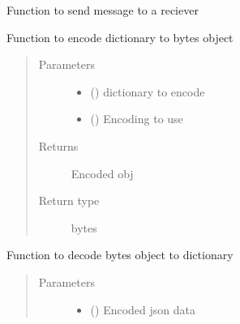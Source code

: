 \documentclass[letterpaper,10pt,english]{sphinxmanual}
\begin{document}
\begin{fulllineitems}
\begin{fulllineitems}
\label{\detokenize{Message:Message.Message._send_msg_to_reciever}}
Function to send message to a reciever

\end{fulllineitems}


\begin{fulllineitems}
\label{\detokenize{Message:Message.Message._json_encode}}
Function to encode dictionary to bytes object
\begin{quote}\begin{description}
\item[{Parameters}] \leavevmode\begin{itemize}
\item {} 
 () \textendash{} dictionary to encode

\item {} 
 () \textendash{} Encoding to use

\end{itemize}

\item[{Returns}] \leavevmode
Encoded obj

\item[{Return type}] \leavevmode
bytes

\end{description}\end{quote}

\end{fulllineitems}


\begin{fulllineitems}
\label{\detokenize{Message:Message.Message._json_decode}}
Function to decode bytes object to dictionary
\begin{quote}\begin{description}
\item[{Parameters}] \leavevmode\begin{itemize}
\item {} 
 () \textendash{} Encoded json data


\end{itemize}
\end{description}
\end{quote}
\end{fulllineitems}
\end{fulllineitems}
\end{document}
